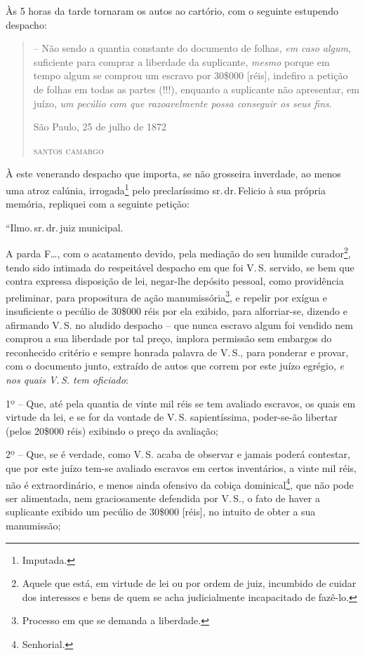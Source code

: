 Às 5 horas da tarde tornaram os autos ao cartório, com o seguinte
estupendo despacho:

\begin{quote}
-- Não sendo a quantia constante do documento de folhas, \emph{em caso
algum}, suficiente para comprar a liberdade da suplicante, \emph{mesmo}
porque em tempo algum se comprou um escravo por 30\$000 {[}réis{]},
indefiro a petição de folhas em todas as partes (!!!), enquanto a
suplicante não apresentar, em juízo, \emph{um pecúlio com que
razoavelmente possa conseguir os seus fins}.

\begin{flushright}
São Paulo, 25 de julho de 1872

\textsc{santos camargo}
\end{flushright}
\end{quote}

À este venerando despacho que importa, se não grosseira inverdade, ao
menos uma atroz calúnia, irrogada\footnote{ Imputada.} pelo
preclaríssimo sr.\,dr.\,Felicio à sua própria memória, repliquei com a
seguinte petição:

``Ilmo.\,sr.\,dr.\,juiz municipal.

A parda F\ldots{}, com o acatamento devido, pela mediação do seu humilde
curador\footnote{ Aquele que está, em virtude de lei ou por ordem de
  juiz, incumbido de cuidar dos interesses e bens de quem se acha
  judicialmente incapacitado de fazê-lo.}, tendo sido intimada do
respeitável despacho em que foi V.\,S. servido, se bem que contra
expressa disposição de lei, negar-lhe depósito pessoal, como providência
preliminar, para propositura de ação manumissória\footnote{ Processo em
  que se demanda a liberdade.}, e repelir por exígua e insuficiente o
pecúlio de 30\$000 réis por ela exibido, para alforriar-se, dizendo e
afirmando V.\,S. no aludido despacho -- que nunca escravo algum foi
vendido nem comprou a sua liberdade por tal preço, implora permissão sem
embargos do reconhecido critério e sempre honrada palavra de V.\,S., para
ponderar e provar, com o documento junto, extraído de autos que correm
por este juízo egrégio, \emph{e nos quais V.\,S. tem oficiado}:

1º -- Que, até pela quantia de vinte mil réis se tem avaliado escravos,
os quais em virtude da lei, e se for da vontade de V.\,S. sapientíssima,
poder-se-ão libertar (pelos 20\$000 réis) exibindo o preço da avaliação;

2º -- Que, se é verdade, como V.\,S. acaba de observar e jamais poderá
contestar, que por este juízo tem-se avaliado escravos em certos
inventários, a vinte mil réis, não é extraordinário, e menos ainda
ofensivo da cobiça dominical\footnote{ Senhorial.}, que não pode ser
alimentada, nem graciosamente defendida por V.\,S., o fato de haver a
suplicante exibido um pecúlio de 30\$000 {[}réis{]}, no intuito de obter
a sua manumissão;

